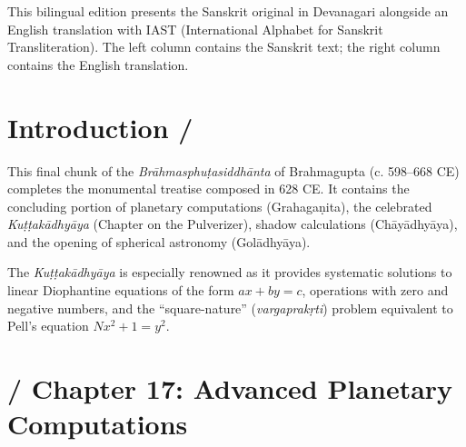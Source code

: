 \documentclass[10pt,a4paper]{article}
\begin{document}
\vspace{1em}
\noindent This bilingual edition presents the Sanskrit original in Devanagari alongside an English translation with IAST (International Alphabet for Sanskrit Transliteration). The left column contains the Sanskrit text; the right column contains the English translation.

\newpage

\section*{Introduction / }

\begin{minipage}[t]{0.47\textwidth}
\end{minipage}%
\hfill\vline\hfill%
\begin{minipage}[t]{0.47\textwidth}
This final chunk of the \textit{Brāhmasphuṭasiddhānta} of Brahmagupta (c. 598--668 CE) completes the monumental treatise composed in 628 CE. It contains the concluding portion of planetary computations (Grahagaṇita), the celebrated \textit{Kuṭṭakādhyāya} (Chapter on the Pulverizer), shadow calculations (Chāyādhyāya), and the opening of spherical astronomy (Golādhyāya).

The \textit{Kuṭṭakādhyāya} is especially renowned as it provides systematic solutions to linear Diophantine equations of the form $ax + by = c$, operations with zero and negative numbers, and the ``square-nature'' (\textit{vargaprakṛti}) problem equivalent to Pell's equation $Nx^2 + 1 = y^2$.
\end{minipage}

\vspace{1.5em}

\newpage
\section*{ / Chapter 17: Advanced Planetary Computations}
\end{document}
